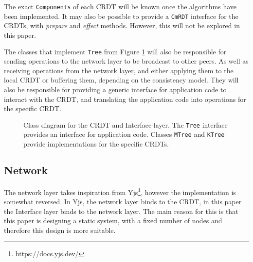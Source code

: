 \documentclass[12pt]{report}
\begin{document}
The exact \texttt{Components} of each CRDT will be known once the algorithms have been implemented. It may also be possible to provide a \texttt{CmRDT} interface for the CRDTs, with \textit{prepare} and \textit{effect} methods. However, this will not be explored in this paper. \par

The classes that implement \texttt{Tree} from Figure \ref{fig:crdt} will also be responsible for sending operations to the network layer to be broadcast to other peers. As well as receiving operations from the network layer, and either applying them to the local CRDT or buffering them, depending on the consistency model. They will also be responsible for providing a generic interface for application code to interact with the CRDT, and translating the application code into operations for the specific CRDT. \par

\begin{figure}[H]
    \centering
    \caption{Class diagram for the CRDT and Interface layer. The \texttt{Tree} interface provides an interface for application code. Classes \texttt{MTree} and \texttt{KTree} provide implementations for the specific CRDTs.}
    \label{fig:crdt}
\end{figure}

\subsection{Network}
The network layer takes inspiration from Yjs\footnote{https://docs.yjs.dev/}, however the implementation is somewhat reversed. In Yjs, the network layer binds to the CRDT, in this paper the Interface layer binds to the network layer. The main reason for this is that this paper is designing a static system, with a fixed number of nodes and therefore this design is more suitable. \par
\end{document}
